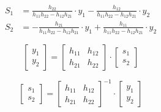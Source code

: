 \documentclass{ltjsarticle}
\begin{document}
\begin{align*}
  S_1 &= \frac{h_{22}}{h_{11}h_{22} - h_{12}h_{21}} \cdot y_1 - \frac{h_{12}}{h_{11}h_{22} - h_{12}h_{21}} \cdot y_2\\
  S_2 &= - \frac{h_{21}}{h_{11}h_{22} - h_{12}h_{21}} \cdot y_1 + \frac{h_{11}}{h_{11}h_{22} - h_{12}h_{21}} \cdot y_2
\end{align*}




\begin{equation*}
  \begin{bmatrix}
    y_1 \\
    y_2
    \end{bmatrix}
    =
    \begin{bmatrix}
    h_{11} & h_{12} \\
    h_{21} & h_{22}
    \end{bmatrix}
    \cdot
    \begin{bmatrix}
    s_1 \\
    s_2
    \end{bmatrix}
\end{equation*}

\begin{equation*}
  \begin{bmatrix}
    s_1 \\
    s_2
    \end{bmatrix}
    =
    \begin{bmatrix}
    h_{11} & h_{12} \\
    h_{21} & h_{22}
    \end{bmatrix}^{-1}
    \cdot
    \begin{bmatrix}
    y_1 \\
    y_2
    \end{bmatrix}
\end{equation*}
\end{document}
